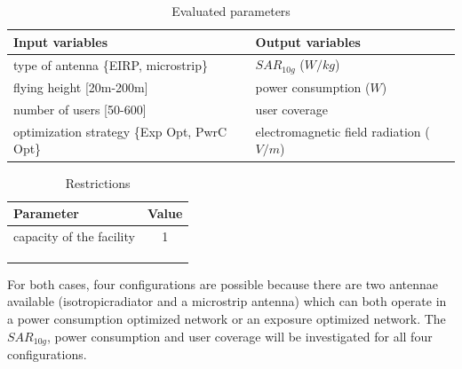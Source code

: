 \begin{table}
\centering
            \begin{tabular}{|l|l|}
            \hline
            \textbf{Input variables  }              & \textbf{Output variables}          \\   \hline 
            type of antenna  \{EIRP, microstrip\}               & $SAR_{10g}$ ($W/kg$)             \\ 
            flying height [20m-200m]                 & power consumption ($W$)          \\ 
            number of users  [50-600]              & user coverage            \\
            optimization strategy \{Exp Opt, PwrC Opt\}        &     electromagnetic field radiation ($V/m$)\\
            \hline
            \end{tabular}
            \caption{Evaluated parameters}
          \label{table:s2:evalpara}
\end{table}
\begin{table}
\centering
        \begin{tabular}{|l|c|}
        \hline
        \textbf{Parameter}            & \textbf{Value}       \\   \hline 
        capacity of the facility          & 1        \\    
        &  \\ 
        & \\ 
        & \\ 
        \hline
        \end{tabular}
                \caption{Restrictions}
        \label{table:S2:restrictions}
\end{table}

For both cases, four configurations are possible because there are two antennae available (\gls{isotropicradiator} and a microstrip antenna) which can both operate in a power consumption optimized network or an exposure optimized 
network. The $SAR_{10g}$, power consumption and user coverage will be investigated for all four configurations.

